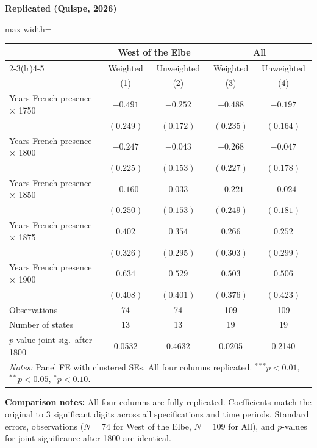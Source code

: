 \documentclass[11pt,a4paper]{article}
\begin{document}
\hfill
\begin{minipage}[t]{0.48\textwidth}
\centering
\textbf{\large Replicated (Quispe, 2026)}
\vspace{0.3cm}

\begin{adjustbox}{max width=\textwidth}
\begin{tabular}{lcccc}
\toprule
 & \multicolumn{2}{c}{West of the Elbe} & \multicolumn{2}{c}{All} \\
\cmidrule(lr){2-3}\cmidrule(lr){4-5}
 & Weighted & Unweighted & Weighted & Unweighted \\
 & (1) & (2) & (3) & (4) \\
\midrule
Years French presence $\times$ 1750 & $-0.491$ & $-0.252$ & $-0.488$ & $-0.197$ \\
 & $(0.249)$ & $(0.172)$ & $(0.235)$ & $(0.164)$ \\[0.3em]
Years French presence $\times$ 1800 & $-0.247$ & $-0.043$ & $-0.268$ & $-0.047$ \\
 & $(0.225)$ & $(0.153)$ & $(0.227)$ & $(0.178)$ \\[0.3em]
Years French presence $\times$ 1850 & $-0.160$ & $0.033$ & $-0.221$ & $-0.024$ \\
 & $(0.250)$ & $(0.153)$ & $(0.249)$ & $(0.181)$ \\[0.3em]
Years French presence $\times$ 1875 & $0.402$ & $0.354$ & $0.266$ & $0.252$ \\
 & $(0.326)$ & $(0.295)$ & $(0.303)$ & $(0.299)$ \\[0.3em]
Years French presence $\times$ 1900 & $0.634$ & $0.529$ & $0.503$ & $0.506$ \\
 & $(0.408)$ & $(0.401)$ & $(0.376)$ & $(0.423)$ \\[0.3em]
\midrule
Observations & 74 & 74 & 109 & 109 \\
Number of states & 13 & 13 & 19 & 19 \\
$p$-value joint sig.\ after 1800 & 0.0532 & 0.4632 & 0.0205 & 0.2140 \\
\bottomrule
\multicolumn{5}{p{0.95\textwidth}}{\footnotesize\textit{Notes:} Panel FE with clustered SEs. All four columns replicated. $^{***}p<0.01$, $^{**}p<0.05$, $^{*}p<0.10$.}
\end{tabular}
\end{adjustbox}
\end{minipage}

\vspace{1cm}
\textbf{Comparison notes:} All four columns are fully replicated. Coefficients match the original to 3 significant digits across all specifications and time periods. Standard errors, observations ($N = 74$ for West of the Elbe, $N = 109$ for All), and $p$-values for joint significance after 1800 are identical.
\end{document}
